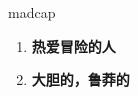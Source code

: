 
\begin{frame}
{\huge madcap}
\begin{center}
\begin{enumerate}\Large
  \item \textbf{热爱冒险的人}
  \item \textbf{大胆的，鲁莽的}
\end{enumerate}
\end{center}
\end{frame}

